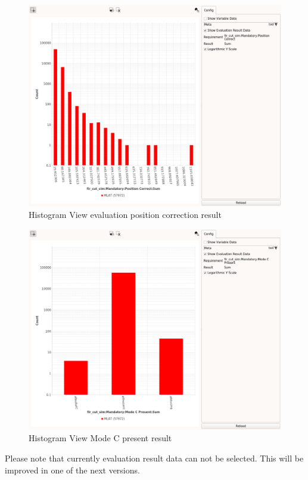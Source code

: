 \begin{figure}[H]
    \hspace*{-2cm}
    \includegraphics[width=18cm,frame]{figures/histogram_eval_pos_correct.png}
  \caption{Histogram View evaluation position correction result}
\end{figure}


\begin{figure}[H]
    \hspace*{-2cm}
    \includegraphics[width=18cm,frame]{figures/histogram_eval_mc.png}
  \caption{Histogram View Mode C present result}
\end{figure}

Please note that currently evaluation result data can not be selected. This will be improved in one of the next versions.
